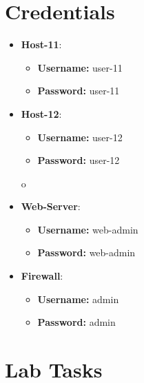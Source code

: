 \section{Credentials}
\begin{itemize}
	\item \textbf{Host-11}:
	\begin{itemize}
		\item \textbf{Username:} user-11
		\item \textbf{Password:} user-11
	\end{itemize}
	\item \textbf{Host-12}:
	\begin{itemize}
		\item \textbf{Username:} user-12
		\item \textbf{Password:} user-12
	\end{itemize}o
	\item \textbf{Web-Server}:
	\begin{itemize}
		\item \textbf{Username:} web-admin
		\item \textbf{Password:} web-admin
	\end{itemize}
	\item \textbf{Firewall}:
	\begin{itemize}
		\item \textbf{Username:} admin
		\item \textbf{Password:} admin
	\end{itemize}
\end{itemize}

\section{Lab Tasks}

